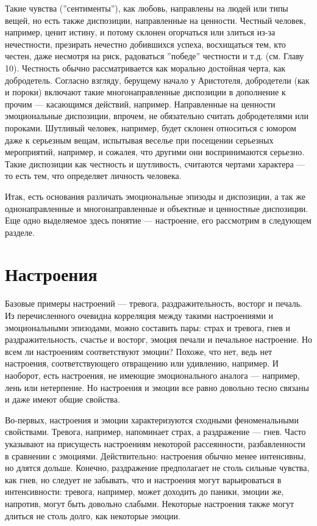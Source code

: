 \documentclass[11pt]{book}
\begin{document}
Такие чувства (''сентименты''), как любовь, направлены на людей или типы вещей, но есть также диспозиции, направленные на ценности. Честный человек, например, ценит истину, и потому склонен огорчаться или злиться из-за нечестности, презирать нечестно добившихся успеха, восхищаться тем, кто честен, даже несмотря на риск, радоваться ''победе'' честности и т.д. (см. Главу 10). Честность обычно рассматривается как морально достойная черта, как добродетель. Согласно взгляду, берущему начало у Аристотеля, добродетели (как и пороки) включают такие многонаправленные диспозиции в дополнение к прочим --- касающимся действий, например. Направленные на ценности эмоциональные диспозиции, впрочем, не обязательно считать добродетелями или пороками. Шутливый человек, например, будет склонен относиться с юмором даже к серьезным вещам, испытывая веселье при посещении серьезных мероприятий, например, и сожалея, что другими они воспринимаются серьезно. Такие диспозиции как честность и шутливость, считаются чертами характера --- то есть тем, что определяет личность человека.

Итак, есть основания различать эмоциональные эпизоды и диспозиции, а так же однонаправленные и многонаправленные и объектные и ценностные диспозиции. Еще одно выделяемое здесь понятие --- настроение, его рассмотрим в следующем разделе.

\section{Настроения}

Базовые примеры настроений --- тревога, раздражительность, восторг и печаль. Из перечисленного очевидна корреляция между такими настроениями и эмоциональными эпизодами, можно составить пары: страх и тревога, гнев и раздражительность, счастье и восторг, эмоция печали и печальное настроение. Но всем ли настроениям соответствуют эмоции? Похоже, что нет, ведь нет настроения, соответствующего отвращению или удивлению, например. И наоборот, есть настроения, не имеющие эмоционального аналога --- например, лень или нетерпение. Но настроения и эмоции все равно довольно тесно связаны и даже имеют общие свойства.

Во-первых, настроения и эмоции характеризуются сходными феноменальными свойствами. Тревога, например, напоминает страх, а раздражение --- гнев. Часто указывают на присущесть настроениям некоторой рассеянности, разбавленности в сравнении с эмоциями. Действительно: настроения обычно менее интенсивны, но длятся дольше. Конечно, раздражение предполагает не столь сильные чувства, как гнев, но следует не забывать, что и настроения могут варьироваться в интенсивности: тревога, например, может доходить до паники, эмоции же, напротив, могут быть довольно слабыми. Некоторые настроения также могут длиться не столь долго, как некоторые эмоции.
\end{document}
